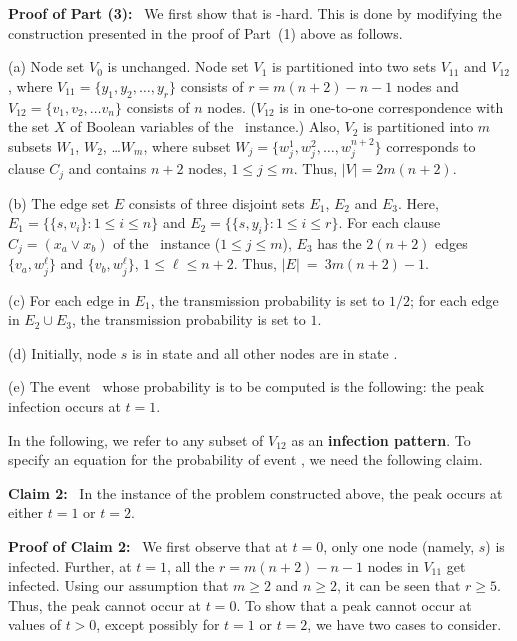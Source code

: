 \medskip
\noindent
\textbf{Proof of Part (3):}~ We first show that \OnePeak{} is
\cnump-hard. 
This is done by modifying the construction presented in
the proof of Part~(1) above as follows.

\begin{description}
\item{(a)} Node set $V_0$ is unchanged.
Node set $V_1$ is partitioned into two sets $V_{11}$ and $V_{12}$,
where $V_{11} = \{y_1, y_2, \ldots, y_r\}$
consists of $r = m(n+2)-n-1$ nodes and $V_{12} = \{v_1, v_2, \ldots v_n\}$
consists of $n$ nodes. 
($V_{12}$ is in one-to-one correspondence
with the set $X$ of Boolean variables of the~ \mtsat{} instance.) 
Also, $V_2$ is partitioned into $m$ subsets $W_1$, $W_2$, \ldots $W_m$,
where subset $W_j = \{w_j^1, w_j^2, \ldots, w_j^{n+2}\}$ 
corresponds to clause $C_j$ and contains $n+2$ nodes, $1 \leq j \leq m$.
Thus,  $|V| = 2m(n+2)$. 

\item{(b)} The edge set $E$ consists of three disjoint sets 
$E_1$, $E_2$ and $E_3$.
Here, $E_1 = \{\{s, v_i\}: 1 \leq i \leq n\}$ and
$E_2 = \{\{s, y_i\}: 1 \leq i \leq r\}$.
For each clause $C_j = (x_a \vee x_b)$ of the~ \mtsat{} instance
($1 \leq j \leq m$),
$E_3$ has the $2(n+2)$ edges $\{v_a, w_j^{\ell}\}$ and
$\{v_b, w_j^{\ell}\}$, $1 \leq \ell \leq n+2$. 
Thus, $|E| ~=~ 3m(n+2)-1$. 

\item{(c)} 
For each edge in $E_1$, the transmission probability is set to $1/2$; 
for each edge in $E_2 \cup E_3$, 
the transmission probability is set to $1$. 

\item{(d)} Initially, node $s$ is in state \istate{} and all
other nodes are in state \sstate.

\item{(e)} The event \cale{} ~whose probability is to be
computed is the following: the peak infection occurs at $t = 1$. 
\end{description}
In the following, we refer to any subset of $V_{12}$
as an \textbf{infection pattern}.
To specify an equation for the probability of event \cale,
we need the following claim. 

\medskip
\noindent
\textbf{Claim 2:}~ In the instance of the \OnePeak{} problem
constructed above, the peak occurs at either $t = 1$ or $t = 2$. 

\noindent
\textbf{Proof of Claim 2:}~ We first observe that at $t = 0$, only
one node (namely, $s$) is infected.
Further, at $t = 1$, all
the $r = m(n+2)-n-1$ nodes in $V_{11}$ get infected.
Using our assumption that $m \geq 2$ and $n \geq 2$,
it can be seen that $r \geq 5$. 
Thus, the peak cannot occur at $t = 0$.
To show that a peak cannot occur at values of $t > 0$,
except possibly for $t = 1$ or $t = 2$, 
we have two cases to consider. 

